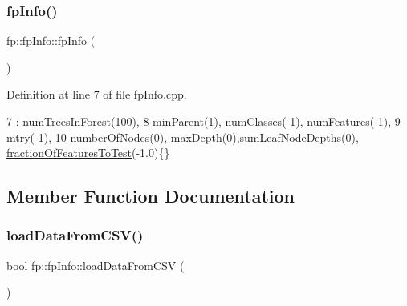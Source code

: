 \subsubsection{\texorpdfstring{fp\+Info()}{fpInfo()}}
{\footnotesize\ttfamily fp\+::fp\+Info\+::fp\+Info (\begin{DoxyParamCaption}{ }\end{DoxyParamCaption})}



Definition at line 7 of file fp\+Info.\+cpp.


\begin{DoxyCode}
7                   : \hyperlink{classfp_1_1fpInfo_a8dbd62dca5c972c29d29a69d90ca2632}{numTreesInForest}(100),
8     \hyperlink{classfp_1_1fpInfo_a128fab7ba6da0fc76da00b48bb1bd7d5}{minParent}(1),  \hyperlink{classfp_1_1fpInfo_a1c98a9ced12230f21003f78d742625a3}{numClasses}(-1), \hyperlink{classfp_1_1fpInfo_a6ed8deabebae772fc213730cd29a2e61}{numFeatures}(-1),
9     \hyperlink{classfp_1_1fpInfo_a62cccc1eb5641ebec2a6cc86cf03eedf}{mtry}(-1), 
10     \hyperlink{classfp_1_1fpInfo_a9404de3ad49dc78e3d5c8e3ef8b04fba}{numberOfNodes}(0), \hyperlink{classfp_1_1fpInfo_a95c744fa049788dd61fa0fccdec4565d}{maxDepth}(0),\hyperlink{classfp_1_1fpInfo_a13afa17097728f059e8525ea382b71cd}{sumLeafNodeDepths}(0), 
      \hyperlink{classfp_1_1fpInfo_ab949cb97523283367e9b120fd78e3c3b}{fractionOfFeaturesToTest}(-1.0)\{\}
\end{DoxyCode}


\subsection{Member Function Documentation}
\mbox{\label{classfp_1_1fpInfo_a2a6ac3cfea5db5842baa1789468492ad}} 
\subsubsection{\texorpdfstring{load\+Data\+From\+C\+S\+V()}{loadDataFromCSV()}}
{\footnotesize\ttfamily bool fp\+::fp\+Info\+::load\+Data\+From\+C\+SV (\begin{DoxyParamCaption}{ }\end{DoxyParamCaption})\hspace{0.3cm}{\ttfamily [inline]}}



